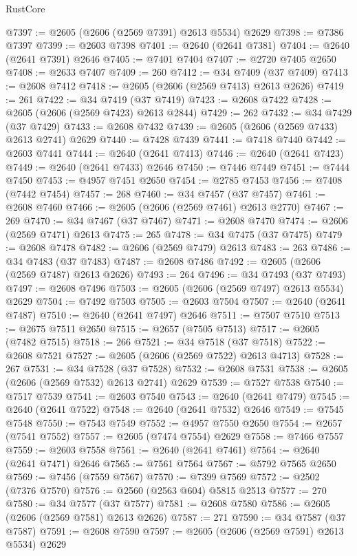 \begin{lexlean}{RustCore}
\begin{coremodule}
@7397 := @2605 (@2606 (@2569 @7391) @2613 @5534) @2629
@7398 := @7386 @7397
@7399 := @2603 @7398
@7401 := @2640 (@2641 @7381)
@7404 := @2640 (@2641 @7391) @2646
@7405 := @7401 @7404
@7407 := @2720 @7405 @2650
@7408 := @2633 @7407
@7409 := 260
@7412 := @34 @7409 (@37 @7409)
@7413 := @2608 @7412
@7418 := @2605 (@2606 (@2569 @7413) @2613 @2626)
@7419 := 261
@7422 := @34 @7419 (@37 @7419)
@7423 := @2608 @7422
@7428 := @2605 (@2606 (@2569 @7423) @2613 @2844)
@7429 := 262
@7432 := @34 @7429 (@37 @7429)
@7433 := @2608 @7432
@7439 := @2605 (@2606 (@2569 @7433) @2613 @2741) @2629
@7440 := @7428 @7439
@7441 := @7418 @7440
@7442 := @2603 @7441
@7444 := @2640 (@2641 @7413)
@7446 := @2640 (@2641 @7423)
@7449 := @2640 (@2641 @7433) @2646
@7450 := @7446 @7449
@7451 := @7444 @7450
@7453 := @4957 @7451 @2650
@7454 := @2785 @7453
@7456 := @7408 (@7442 @7454)
@7457 := 268
@7460 := @34 @7457 (@37 @7457)
@7461 := @2608 @7460
@7466 := @2605 (@2606 (@2569 @7461) @2613 @2770)
@7467 := 269
@7470 := @34 @7467 (@37 @7467)
@7471 := @2608 @7470
@7474 := @2606 (@2569 @7471) @2613
@7475 := 265
@7478 := @34 @7475 (@37 @7475)
@7479 := @2608 @7478
@7482 := @2606 (@2569 @7479) @2613
@7483 := 263
@7486 := @34 @7483 (@37 @7483)
@7487 := @2608 @7486
@7492 := @2605 (@2606 (@2569 @7487) @2613 @2626)
@7493 := 264
@7496 := @34 @7493 (@37 @7493)
@7497 := @2608 @7496
@7503 := @2605 (@2606 (@2569 @7497) @2613 @5534) @2629
@7504 := @7492 @7503
@7505 := @2603 @7504
@7507 := @2640 (@2641 @7487)
@7510 := @2640 (@2641 @7497) @2646
@7511 := @7507 @7510
@7513 := @2675 @7511 @2650
@7515 := @2657 (@7505 @7513)
@7517 := @2605 (@7482 @7515)
@7518 := 266
@7521 := @34 @7518 (@37 @7518)
@7522 := @2608 @7521
@7527 := @2605 (@2606 (@2569 @7522) @2613 @4713)
@7528 := 267
@7531 := @34 @7528 (@37 @7528)
@7532 := @2608 @7531
@7538 := @2605 (@2606 (@2569 @7532) @2613 @2741) @2629
@7539 := @7527 @7538
@7540 := @7517 @7539
@7541 := @2603 @7540
@7543 := @2640 (@2641 @7479)
@7545 := @2640 (@2641 @7522)
@7548 := @2640 (@2641 @7532) @2646
@7549 := @7545 @7548
@7550 := @7543 @7549
@7552 := @4957 @7550 @2650
@7554 := @2657 (@7541 @7552)
@7557 := @2605 (@7474 @7554) @2629
@7558 := @7466 @7557
@7559 := @2603 @7558
@7561 := @2640 (@2641 @7461)
@7564 := @2640 (@2641 @7471) @2646
@7565 := @7561 @7564
@7567 := @5792 @7565 @2650
@7569 := @7456 (@7559 @7567)
@7570 := @7399 @7569
@7572 := @2502 (@7376 @7570)
@7576 := @2560 (@2563 @604) @5815 @2513
@7577 := 270
@7580 := @34 @7577 (@37 @7577)
@7581 := @2608 @7580
@7586 := @2605 (@2606 (@2569 @7581) @2613 @2626)
@7587 := 271
@7590 := @34 @7587 (@37 @7587)
@7591 := @2608 @7590
@7597 := @2605 (@2606 (@2569 @7591) @2613 @5534) @2629

\end{coremodule}
\end{lexlean}
